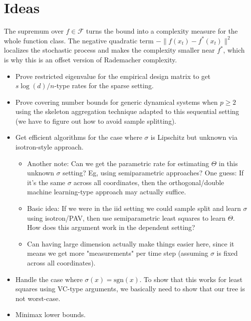 \documentclass[11pt]{article}
\newcommand{\F}{\ensuremath{\mathcal F}}
\begin{document}
\section{Ideas}
%
The supremum over \(f\in\F\) turns the bound into a complexity measure for the whole function class.
The negative quadratic term \(-\|f(x_t)-f^*(x_t)\|^2\) localizes the stochastic process and makes the complexity smaller near \(f^*\), which is why this is an offset version of Rademacher complexity.






\begin{itemize}
\item Prove restricted eigenvalue for the empirical design matrix to get $s\log(d)/n$-type rates for the sparse setting.
\item Prove covering number bounds for generic dynamical systems when $p\geq{}2$ using the skeleton aggregation technique adapted to this sequential setting (we have to figure out how to avoid sample splitting).
\item Get efficient algorithms for the case where $\sigma$ is Lipschitz but unknown via isotron-style approach.
\begin{itemize}
\item Another note: Can we get the parametric rate for estimating $\Theta$ in this unknown $\sigma$ setting? Eg, using semiparametric approaches? One guess: If it's the same $\sigma$ across all coordinates, then the orthogonal/double machine learning-type approach may actually suffice. 
\item Basic idea: If we were in the iid setting we could sample split and learn $\sigma$ using isotron/PAV, then use semiparametric least squares to learn $\Theta$. How does this argument work in the dependent setting?
\item Can having large dimension actually make things easier here, since it means we get more "measurements" per time step (assuming $\sigma$ is fixed across all coordinates).
\end{itemize}
\item Handle the case where $\sigma(x)=\mathrm{sgn}(x)$. To show that this works for least squares using VC-type arguments, we basically need to show that our tree is not worst-case.
\item Minimax lower bounds.
\end{itemize}
\end{document}
